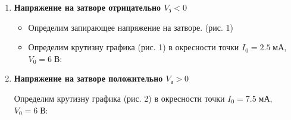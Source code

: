 \documentclass[a4paper]{article}
\begin{document}
\begin{enumerate}
    \item \textbf{Напряжение на затворе отрицательно $V_з < 0$} \par 

    \begin{itemize}
        \item  Определим запирающее напряжение на затворе. (рис. 1)

                \begin{center}
                \end{center}

        \item Определим крутизну графика (рис. 1) в окресности точки $I_0 = 2.5\; мА$, $V_0 = 6\; В$:

            \begin{center}
            \end{center}

    \end{itemize}

    \item \textbf{Напряжение на затворе положительно $V_з > 0$} \par 
    Определим крутизну графика (рис. 2) в окресности точки $I_0 = 7.5\; мА$, $V_0 = 6\; В$:

    \begin{center}
    \end{center}

\end{enumerate}



	
\end{document}
